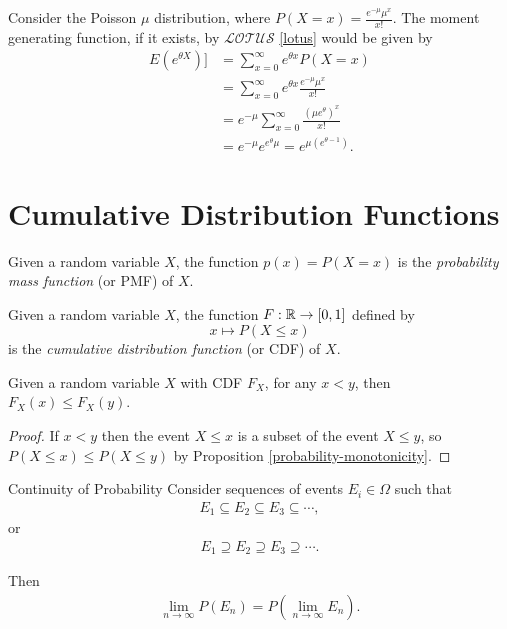 \begin{exmp}
    Consider the Poisson $\mu$ distribution, where $P(X = x) = \frac{e^{-\mu}\mu^x}{x!}$. The moment generating function, if it exists, by $\mathcal{LOTUS}$ \ref{lotus} would be given by
    \begin{align*}
       E(e^{\theta X})] &= \sum_{x=0}^{\infty}e^{\theta x}P(X = x) \\
       &= \sum_{x=0}^{\infty}e^{\theta x}\frac{e^{-\mu}\mu^x}{x!} \\
       &= e^{-\mu}\sum_{x=0}^{\infty}\frac{\left(\mu e^{\theta}\right)^{x}}{x!} \\
       &= e^{-\mu}e^{e^{\theta}\mu} = e^{\mu(e^{\theta-1})}.
    \end{align*}
\end{exmp}

\section{Cumulative Distribution Functions}

\begin{defn}
    Given a random variable $X$, the function $p(x) = P(X = x)$ is the \emph{probability mass function} (or PMF) of $X$.
\end{defn}

\begin{defn}
    Given a random variable $X$, the function $F: \mathbb{R} \to [0, 1]$ defined by
    \[x \mapsto P(X \leq x)\]
    is the \emph{cumulative distribution function} (or CDF) of $X$.
\end{defn}

\begin{prop}
    Given a random variable $X$ with CDF $F_X$, for any $x < y$, then $F_X(x) \leq F_X(y)$.
\end{prop}

\begin{proof}
    If $x < y$ then the event $X \leq x$ is a subset of the event $X \leq y$, so $P(X \leq x) \leq P(X \leq y)$ by Proposition \ref{probability-monotonicity}.
\end{proof}

\begin{thm}{Continuity of Probability}\label{continuity-of-probability}\proofbreak
    Consider sequences of events $E_i \in \Omega$ such that
    \begin{align*}
        E_1 \subseteq E_2 \subseteq E_3 \subseteq \cdots,
    \end{align*}
    or
    \begin{align*}
        E_1 \supseteq E_2 \supseteq E_3 \supseteq \cdots.
    \end{align*}

    Then
    \begin{align*}
        \lim_{n \to \infty}P(E_n) = P\left(\lim_{n \to \infty}E_n\right).
    \end{align*}
\end{thm}

